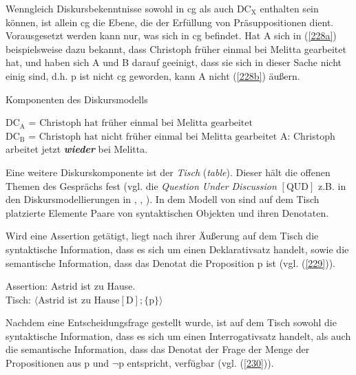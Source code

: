 Wenngleich Diskursbekenntnisse sowohl in cg als auch $\textrm{DC}_{\textrm{X}}$ enthalten sein können, ist allein cg die Ebene, die der Erfüllung von Präsuppositionen  dient. Vorausgesetzt werden kann nur, was sich in cg befindet. Hat A sich in (\ref{228a}) beispielsweise dazu bekannt, dass Christoph früher einmal bei Melitta gearbeitet hat, und haben sich A und B darauf geeinigt, dass sie sich in dieser Sache nicht einig sind, d.h. p ist nicht cg geworden, kann A nicht (\ref{228b}) äußern.

\begin{exe}
	\ex\label{228} 
		Komponenten des Diskursmodells
		\begin{xlist}	
			\ex\label{228a} $\textrm{DC}_{\textrm{A}}$ = ${\textrm{Christoph hat früher einmal bei Melitta gearbeitet}}$\\
							$\textrm{DC}_{\textrm{B}}$ = ${\textrm{Christoph hat nicht früher einmal bei Melitta gearbeitet}}$	
			\ex\label{228b} A: Christoph arbeitet jetzt \textbf{\textit{wieder}} bei Melitta.  
		\end{xlist}
\end{exe}

\noindent
Eine weitere Diskurskomponente ist der \textit{Tisch}  (\textit{table}). Dieser hält die offenen Themen des Gesprächs fest (vgl. die \textit{Question Under Discussion}  $[\textrm{QUD}]$ z.B. in den Diskursmodellierungen in \citealt{Ginzburg1996}, \citealt{Roberts1996}, \citealt{Buering2003}). In dem Modell von \citet{Farkas2010} sind auf dem Tisch platzierte Elemente Paare von syntaktischen Objekten und ihren Denotaten. 

Wird eine Assertion  getätigt, liegt nach ihrer Äußerung auf dem Tisch die syntaktische Information, dass es sich um einen Deklarativsatz handelt, sowie die semantische Information, dass das Denotat die Proposition p ist (vgl. (\ref{229})).

\begin{exe}
	\ex\label{229} 
			Assertion: Astrid ist zu Hause.\\
			Tisch: $\langle \textrm{Astrid ist zu Hause}[\textrm{D}]; \lbrace \textrm{p}\rbrace \rangle$
\end{exe}
Nachdem eine Entscheidungsfrage  gestellt wurde, ist auf dem Tisch sowohl die syntaktische Information, dass es sich um einen Interrogativsatz handelt, als auch die semantische Information, dass das Denotat der Frage der Menge der Propositionen aus p und $\neg$p entspricht, verfügbar (vgl. (\ref{230})).

